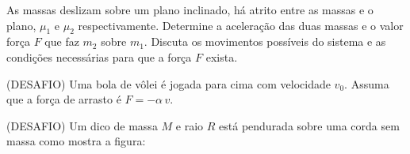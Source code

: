 \documentclass[]{IMTexam}
\begin{document}
\begin{questions}
\begin{solution}
	\end{solution}

	\question As massas deslizam sobre um plano inclinado, há atrito entre as massas e o plano, $\mu_1$ e $\mu_2$ respectivamente. Determine a aceleração das duas massas e o valor força $ F $ que faz $ m_2 $ sobre $ m_1 $. Discuta os movimentos possíveis do sistema e as condições necessárias para que a força $ F $ exista.

	\begin{solution}

	\end{solution}

	\question (DESAFIO) Uma bola de vôlei é jogada para cima com velocidade $ v_0 $. Assuma que a força de arrasto é $ F = -\alpha\,v $.


	\question (DESAFIO) Um dico de massa $ M $ e raio $ R $ está pendurada sobre uma corda sem massa como mostra a figura:

\end{questions}
\end{document}
